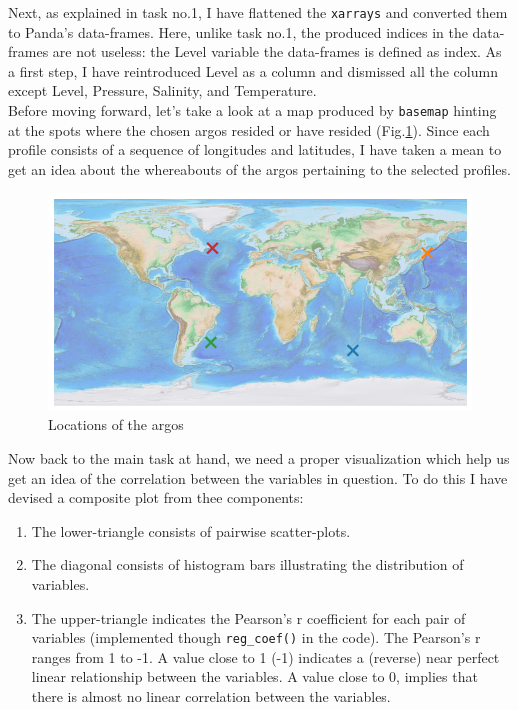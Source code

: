 \documentclass[12pt]{article}
\begin{document}
Next, as explained in task no.1, I have flattened the \verb|xarrays| 
and converted them to Panda's data-frames. Here, unlike
task no.1, the produced indices in the data-frames are not useless: 
the Level variable the data-frames is defined as 
index. As a first step, I have reintroduced Level as a column and 
dismissed all the column except Level, Pressure, 
Salinity, and Temperature.\\

Before moving forward, let's take a look at a map produced by 
\verb|basemap| hinting at the spots where
the chosen argos resided or have resided (Fig.\ref{map}). 
Since each profile consists of a sequence of longitudes and 
latitudes,
I have taken a mean to get an idea about the whereabouts of 
the argos pertaining to the selected profiles.\\

\begin{figure}[!ht]
    \centering
    \includegraphics[scale=0.7]{map_of_locations.png}
    \caption{Locations of the argos}
    \label{map}
\end{figure}

Now back to the main task at hand, we need a proper 
visualization which help us get an idea of the correlation
between the variables in question. To do this I have 
devised a composite plot from thee components: 

\begin{enumerate}
    \item The lower-triangle consists of pairwise scatter-plots.
    \item The diagonal consists of histogram bars illustrating 
    the distribution of variables.
    \item The upper-triangle indicates the Pearson's r 
    coefficient for each pair of variables 
    (implemented though \verb|reg_coef()| 
    in the code). The Pearson's r ranges from 1 to -1.
    A value close to 1 (-1) indicates a (reverse) near
    perfect linear relationship between the variables.
    A value close to 0, implies that there is almost no 
    linear correlation between the variables.
\end{enumerate}
\end{document}
